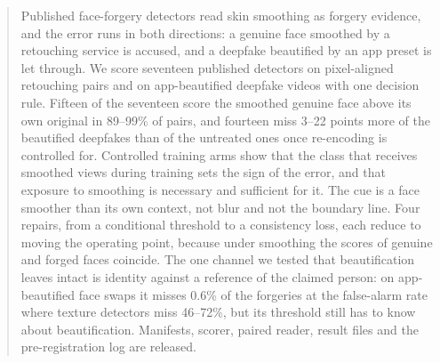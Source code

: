 \documentclass[conference]{IEEEtran}
\begin{document}
\begin{abstract}
Published face-forgery detectors read skin smoothing as forgery evidence, and the error runs in both directions: a genuine
face smoothed by a retouching service is accused, and a deepfake beautified by an app preset is let through. We score seventeen published detectors on pixel-aligned retouching pairs and on app-beautified deepfake videos with one decision rule. Fifteen of the seventeen score the smoothed genuine face above its own original
in 89--99\% of pairs,
and fourteen miss 3--22 points more of the beautified deepfakes than of the untreated ones once re-encoding is controlled for.
Controlled training arms show that the class that receives smoothed views during training
sets the sign of the error, and that exposure to smoothing is necessary and sufficient for it. The cue is a face smoother than
its own context, not blur and not the boundary line. Four repairs, from a conditional threshold to a consistency loss, each reduce to moving the operating point, because under smoothing the scores of genuine and forged faces coincide. The one channel we tested that beautification leaves intact is identity against a reference of the claimed person: on app-beautified face swaps it misses 0.6\% of the forgeries at the false-alarm rate where texture
detectors miss 46--72\%,
but its threshold still has to know about beautification. Manifests, scorer, paired reader, result files and the pre-registration log are released.
\end{abstract}

\end{document}
